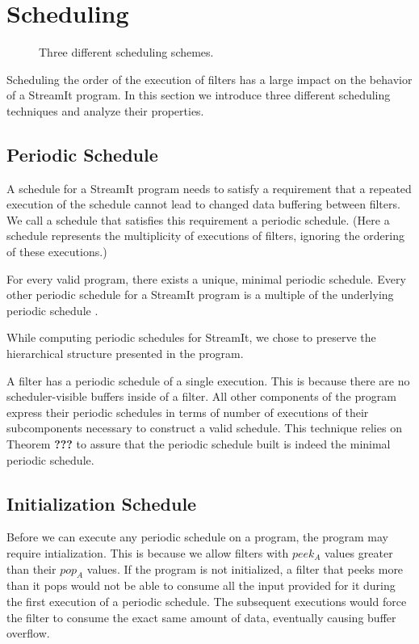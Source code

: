 \section{Scheduling}

\begin{figure}
\centering
{}
\caption{Three different scheduling schemes.}
\label{fig:sched}

\end{figure}

Scheduling the order of the execution of filters has a large impact on 
the behavior of a StreamIt program.  In this section we introduce three
different scheduling techniques and analyze their properties.

\subsection{Periodic Schedule}
A schedule for a StreamIt program needs to satisfy a requirement that
a repeated execution of the schedule cannot lead to changed data
buffering between filters.  We call a schedule that satisfies this
requirement a periodic schedule.  (Here a schedule represents the
multiplicity of executions of filters, ignoring the ordering of these
executions.)

For every valid program, there exists a unique, minimal periodic
schedule.  Every other periodic schedule for a StreamIt program is a
multiple of the underlying periodic schedule \cite{bhat1994x3}.

While computing periodic schedules for StreamIt, we chose to preserve the
hierarchical structure presented in the program.

A filter has a periodic schedule of a single execution.  This is
because there are no scheduler-visible buffers inside of a filter.
All other components of the program express their periodic schedules
in terms of number of executions of their subcomponents necessary to
construct a valid schedule.  This technique relies on Theorem {\bf
???} to assure that the periodic schedule built is indeed the minimal
periodic schedule.

\subsection{Initialization Schedule}

Before we can execute any periodic schedule on a program, the program
may require intialization.  This is because we allow filters with
$peek_A$ values greater than their $pop_A$ values.  If the program is
not initialized, a filter that peeks more than it pops would not be
able to consume all the input provided for it during the first
execution of a periodic schedule.  The subsequent executions would
force the filter to consume the exact same amount of data, eventually
causing buffer overflow.

